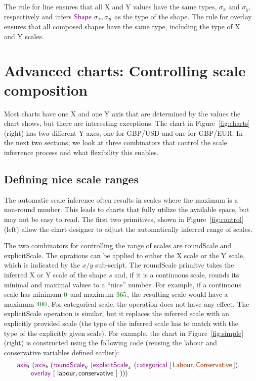 \documentclass{jfp}
\newcommand{\num}[1]{\textcolor{numclr}{#1}}
\newcommand{\strf}[1]{\textnormal{\textcolor{strclr}{\sffamily #1}}}
\newcommand{\ident}[1]{\textnormal{\textcolor{idclr}{\sffamily #1}}}
\newcommand{\kvd}[1]{\textnormal{\textcolor{kvdclr}{\sffamily #1}}}
\begin{document}
\vspace{-0.5em}
\noindent
The rule for \kvd{line} ensures that all X and Y values have the same types, $\sigma_x$ and $\sigma_y$,
respectively and infers $\kvd{Shape}~\sigma_x, \sigma_y$ as the type of the shape. The rule for
\kvd{overlay} ensures that all composed shapes have the same type, including the type of X and Y scales.



\section{Advanced charts: Controlling scale composition}
\label{sec:fancy}

Most charts have one X and one Y axis that are determined by the values the chart shows,
but there are interesting exceptions. The chart in Figure~\ref{fig:charts} (right)
has two different Y axes, one for GBP/USD and one for GBP/EUR. In the next two sections, we look at
three combinators that control the scale inferrence process and what flexibility this enables.

\subsection{Defining nice scale ranges}

The automatic scale inference often results in scales where the maximum is a non-round number.
This leads to charts that fully utilize the available space, but may not be easy to read.
The first two primitives, shown in Figure~\ref{fig:control} (left) allow the chart designer
to adjust the automatically inferred range of scales.

The two combinators for controlling the range of scales are \kvd{roundScale} and \kvd{explicitScale}.
The oprations can be applied to either the X scale or the Y scale, which is indicated by the
$x/y$ sub-script. The \kvd{roundScale} primitve takes the inferred X or Y scale of the shape $s$
and, if it is a continuous scale, rounds its minimal and maximal values to a ``nice'' number.
For example, if a continuous scale has minimum $\num{0}$ and maximum $\num{365}$, the resulting
scale would have a maximum $\num{400}$. For categorical scale, the operation does not have any effect.
The \kvd{explicitScale} operation is similar, but it replaces the inferred scale with an explicitly
provided scale (the type of the inferred scale has to match with the type of the explicitly given
scale). For example, the chart in Figure~\ref{fig:simple} (right) is constructed using the
following code (reusing the \ident{labour} and \ident{conservative} variables defined earlier):
%
\begin{equation*}
\begin{array}{l}
\kvd{axis}_l~(\kvd{axis}_b~(\kvd{roundScale}_y~(\kvd{explicitScale}_x~(\kvd{categorical}~[\,\strf{Labour},\strf{Conservative}\,]),\\
\qquad \kvd{overlay}~[~\ident{labour}, \ident{conservative}~]~)))\\
\end{array}
\end{equation*}
\vspace{-0.5em}
\end{document}
